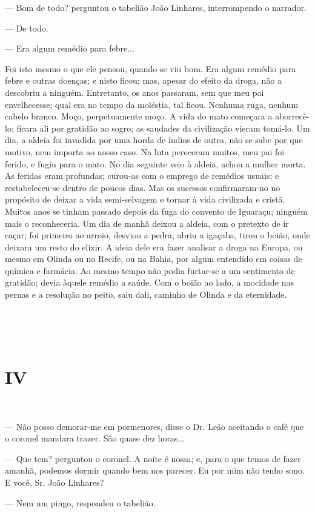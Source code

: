 --- Bom de todo? perguntou o tabelião João Linhares, interrompendo o
narrador.

--- De todo.

--- Era algum remédio para febre...

Foi isto mesmo o que ele pensou, quando se viu bom. Era algum remédio
para febre e outras doenças; e nisto ficou; mas, apesar do efeito da
droga, não a descobriu a ninguém. Entretanto, os anos passaram, sem que
meu pai envelhecesse; qual era no tempo da moléstia, tal ficou. Nenhuma
ruga, nenhum cabelo branco. Moço, perpetuamente moço. A vida do mato
começara a aborrecê-lo; ficara ali por gratidão ao sogro; as saudades da
civilização vieram tomá-lo. Um dia, a aldeia foi invadida por uma horda
de índios de outra, não se sabe por que motivo, nem importa ao nosso
caso. Na luta pereceram muitos, meu pai foi ferido, e fugiu para o mato.
No dia seguinte veio à aldeia, achou a mulher morta. As feridas eram
profundas; curou-as com o emprego de remédios usuais; e restabeleceu-se
dentro de poucos dias. Mas os sucessos confirmaram-no no propósito de
deixar a vida semi-selvagem e tornar à vida civilizada e cristã. Muitos
anos se tinham passado depois da fuga do convento de Iguaraçu; ninguém
mais o reconheceria. Um dia de manhã deixou a aldeia, com o pretexto de
ir caçar; foi primeiro ao arroio, desviou a pedra, abriu a igaçaba,
tirou o boião, onde deixara um resto do elixir. A ideia dele era fazer
analisar a droga na Europa, ou mesmo em Olinda ou no Recife, ou na
Bahia, por algum entendido em coisas de química e farmácia. Ao mesmo
tempo não podia furtar-se a um sentimento de gratidão; devia àquele
remédio a saúde. Com o boião ao lado, a mocidade nas pernas e a
resolução no peito, saiu dali, caminho de Olinda e da eternidade.

~~

~

\section{IV}

~

--- Não posso demorar-me em pormenores, disse o Dr. Leão aceitando o
café que o coronel mandara trazer. São quase dez horas...

--- Que tem? perguntou o coronel. A noite é nossa; e, para o que temos
de fazer amanhã, podemos dormir quando bem nos parecer. Eu por mim não
tenho sono. E você, Sr. João Linhares?

--- Nem um pingo, respondeu o tabelião.

